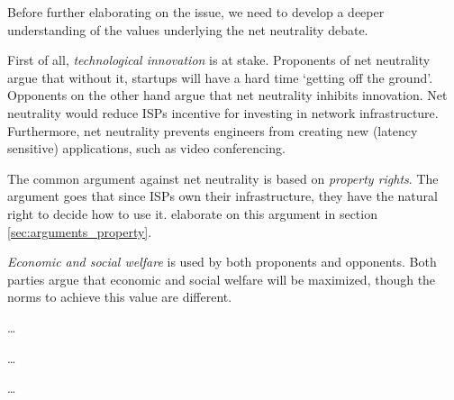 
Before further elaborating on the issue, we need to develop a deeper understanding of the values underlying the net neutrality debate.

First of all, \emph{technological innovation} is at stake. Proponents of net neutrality argue that without it, startups will have a hard time `getting off the ground'. Opponents on the other hand argue that net neutrality inhibits innovation. Net neutrality would reduce \acp{ISP} incentive for investing in network infrastructure. Furthermore, net neutrality prevents engineers from creating new (latency sensitive) applications, such as video conferencing.

The common argument against net neutrality is based on \emph{property rights}. The argument goes that since \acp{ISP} own their infrastructure, they have the natural right to decide how to use it.  elaborate on this argument in section \ref{sec:arguments_property}.

\emph{Economic and social welfare} is used by both proponents and opponents. Both parties argue that economic and social welfare will be maximized, though the norms to achieve this value are different.

\ldots

\ldots

\ldots